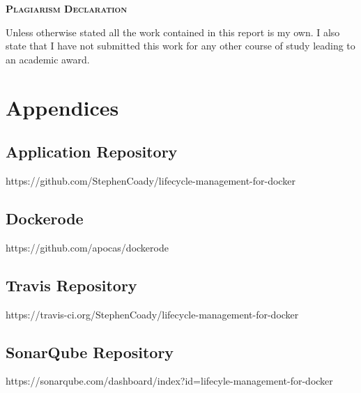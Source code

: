 \documentclass{article}
\begin{document}
\onehalfspacing
\hypersetup{pageanchor=false}

\hypersetup{pageanchor=true}
\clearpage
\begin{center}
\begin{minipage}{\textwidth}
  
  {\scshape\large \textbf{Plagiarism Declaration}\par}
  \vspace{1cm}
  Unless otherwise stated all the work contained in this report is my own.  I also state that I have not submitted this work for any other course of study leading to an academic award.
\end{minipage}
\end{center}
\vfill %
\clearpage

\tableofcontents

\newpage
\printglossaries




\newpage
\appendix
\section*{Appendices}
\renewcommand{\thesubsection}{\Alph{subsection}}

\subsection{Application Repository}
\label{appendix:code}
https://github.com/StephenCoady/lifecycle-management-for-docker

\subsection{Dockerode} 
\label{appendix:dockerode_appendix}
https://github.com/apocas/dockerode

\subsection{Travis Repository} 
\label{appendix:travis}
https://travis-ci.org/StephenCoady/lifecycle-management-for-docker

\subsection{SonarQube Repository} 
\label{appendix:sonarqube}
https://sonarqube.com/dashboard/index?id=lifecyle-management-for-docker

\newpage

\end{document}
